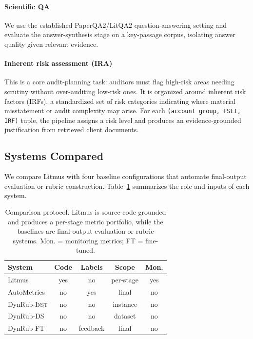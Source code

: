 \documentclass[11pt]{article}
\begin{document}
\paragraph{Scientific QA} We use the established PaperQA2/LitQA2 \citep{skarlinski2024languageagentsachievesuperhuman} question-answering setting and evaluate the answer-synthesis stage on a key-passage corpus, isolating answer quality given relevant evidence.

\paragraph{Inherent risk assessment (IRA)} This is a core audit-planning task: auditors must flag high-risk areas needing scrutiny without over-auditing low-risk ones. It is organized around inherent risk factors (IRFs), a standardized set of risk categories indicating where material misstatement or audit complexity may arise. For each \texttt{(account group, FSLI, IRF)} tuple, the pipeline assigns a risk level and produces an evidence-grounded justification from retrieved client documents.

\subsection{Systems Compared}
\label{sec:systems_compared}

We compare Litmus with four baseline configurations that automate final-output evaluation or rubric construction. Table~\ref{tab:comparison_protocol} summarizes the role and inputs of each system.

\begin{table}[t]
\centering
\setlength{\tabcolsep}{3pt}
\begin{tabular}{lcccc}
\toprule
System & Code & Labels & Scope & Mon. \\
\midrule
Litmus & yes & no & per-stage & yes \\
AutoMetrics & no & yes & final & no \\
DynRub-\textsc{Inst} & no & no & instance & no \\
DynRub-\textsc{DS} & no & no & dataset & no \\
DynRub-\textsc{FT} & no & feedback & final & no \\
\bottomrule
\end{tabular}
\caption{
Comparison protocol. Litmus is source-code grounded and produces a per-stage metric portfolio, while the baselines are final-output evaluation or rubric systems. Mon. = monitoring metrics; FT = fine-tuned.
}
\label{tab:comparison_protocol}
\end{table}
\end{document}
